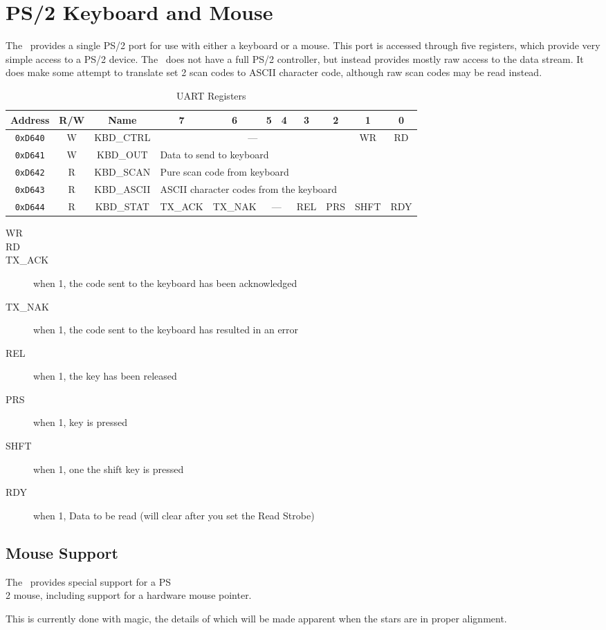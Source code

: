 \chapter{PS/2 Keyboard and Mouse}

The \jr\ provides a single PS/2 port for use with either a keyboard or a mouse. This port is accessed through five registers, which provide very simple access to a PS/2 device. The \jr\ does not have a full PS/2 controller, but instead provides mostly raw access to the data stream. It does make some attempt to translate set 2 scan codes to ASCII character code, although raw scan codes may be read instead.

\begin{table}[h]
    \begin{center}
        \begin{tabular}{|c|c|c|c|c|c|c|c|c|c|c|} \hline
            Address & R/W & Name & 7 & 6 & 5 & 4 & 3 & 2 & 1 & 0 \\\hline\hline
            \verb+0xD640+ & W & KBD\_CTRL & \multicolumn{6}{|c|}{---} & WR & RD \\\hline
            \verb+0xD641+ & W & KBD\_OUT & \multicolumn{8}{|l|}{Data to send to keyboard} \\ \hline
            \verb+0xD642+ & R & KBD\_SCAN & \multicolumn{8}{|l|}{Pure scan code from keyboard} \\ \hline
            \verb+0xD643+ & R & KBD\_ASCII & \multicolumn{8}{|l|}{ASCII character codes from the keyboard} \\ \hline
            \verb+0xD644+ & R & KBD\_STAT & TX\_ACK & TX\_NAK & \multicolumn{2}{|c|}{---} & REL & PRS & SHFT & RDY \\ \hline
        \end{tabular}
    \end{center}
    \caption{UART Registers}
    \label{tab:ps2_reg}
\end{table}

\begin{description}
    \item[WR]
    \item[RD]
    \item[TX\_ACK] when 1, the code sent to the keyboard has been acknowledged
    \item[TX\_NAK] when 1, the code sent to the keyboard has resulted in an error
    \item[REL] when 1, the key has been released
    \item[PRS] when 1, key is pressed
    \item[SHFT] when 1, one the shift key is pressed
    \item[RDY] when 1, Data to be read (will clear after you set the Read Strobe)   
\end{description}

\section*{Mouse Support}

The \jr\ provides special support for a PS\\2 mouse, including support for a hardware mouse pointer.

This is currently done with magic, the details of which will be made apparent when the stars are in proper alignment.
